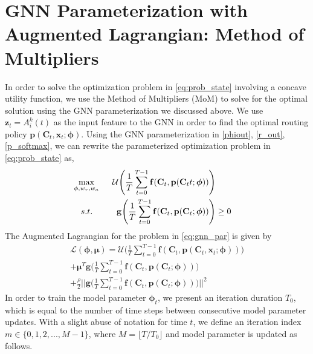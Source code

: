 \documentclass[lettersize,journal]{IEEEtran}
\begin{document}
\section{GNN Parameterization with Augmented Lagrangian: Method of Multipliers} \label{sec:gnn_mom}
In order to solve the optimization problem in \eqref{eq:prob_state} involving a concave utility function, we use the Method of Multipliers (MoM) to solve for the optimal solution using the GNN parameterization we discussed above. We use $\mathbf{z}_t = A_i^k(t)$ as the input feature to the GNN in order to find the optimal routing policy $\mathbf{p}(\mathbf{C}_t,\mathbf{x}_t;\bm{\phi})$. Using the GNN parameterization in \eqref{phiout}, \eqref{r_out}, \eqref{p_softmax}, we can rewrite the parameterized optimization problem in \eqref{eq:prob_state} as,
\begin{subequations} \label{eq:gnn_par}
\begin{align}
    \max_{\phi, w_r, w_a} \hspace{0.5cm} \mathcal{U} \Biggl(\frac{1}{T} \sum_{t=0}^{T-1} \mathbf{f}(\mathbf{C}_t, \mathbf{p}(\mathbf{C}_tt;\bm{\phi}))\Biggl) \\
    s.t. \hspace{1cm} \mathbf{g}\Biggl(\frac{1}{T} \sum_{t=0}^{T-1} \mathbf{f}(\mathbf{C}_t, \mathbf{p}(\mathbf{C}_t;\bm{\phi})) \Biggl) & \geq 0 \label{gnnconst1}  
\end{align}
\end{subequations}
The Augmented Lagrangian for the problem in \eqref{eq:gnn_par} is given by
\begin{multline} \label{aug_lag1}
    \mathcal{L}(\bm{\phi}, \bm{\mu}) = \mathcal{U} \Biggl(\frac{1}{T} \sum_{t=0}^{T-1} \mathbf{f}(\mathbf{C}_t, \mathbf{p}(\mathbf{C}_t, \mathbf{x}_t;\bm{\phi}))\Biggl) \\ 
     + \bm{\mu}^T  \mathbf{g}\Biggl(\frac{1}{T} \sum_{t=0}^{T-1} \mathbf{f}(\mathbf{C}_t, \mathbf{p}(\mathbf{C}_t;\bm{\phi})) \Biggl) \\
    + \frac{\rho}{2} \Biggl|\!\Biggl| \mathbf{g}\Biggl(\frac{1}{T} \sum_{t=0}^{T-1} \mathbf{f}(\mathbf{C}_t, \mathbf{p}(\mathbf{C}_t;\bm{\phi})) \Biggl) \Biggr|\!\Biggr|^2
\end{multline}
In order to train the model parameter $\bm{\phi}_t$, we present an iteration duration $T_0$, which is equal to the number of time steps between consecutive model parameter updates. With a slight abuse of notation for time $t$, we define an iteration index $m \in \{0,1, 2, ..., M-1\}$, where $M = \lfloor T/T_0 \rfloor$ and model parameter is updated as follows.
\end{document}
